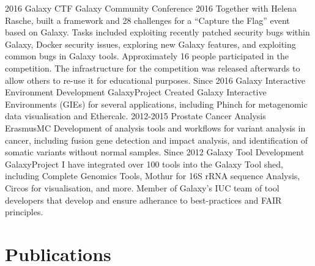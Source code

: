 \documentclass[]{shiltemann-cv}
\begin{document}
\begin{entrylist}
  \entry
    {2016}
    {Galaxy CTF}
    {Galaxy Community Conference 2016}
    {Together with Helena Rasche, built a framework and 28 challenges for a “Capture the Flag” event based on Galaxy. Tasks included exploiting recently patched security bugs within Galaxy, Docker security issues, exploring new Galaxy features, and exploiting common bugs in Galaxy tools. Approximately 16 people participated in the competition. The infrastructure for the competition was released afterwards to allow others to re-use it for educational purposes.}
   \entry
     {Since 2016}
     {Galaxy Interactive Environment Development}
     {GalaxyProject}
     {Created Galaxy Interactive Environments (GIEs) for several applications, including Phinch for metagenomic data visualisation and Ethercalc.}
   \entry
     {2012-2015}
     {Prostate Cancer Analysis}
     {ErasmusMC}
     {Development of analysis tools and workflows for variant analysis in cancer, including fusion gene detection and impact analysis, and identification of somatic variants without normal samples.}
   \entry
    {Since 2012}
    {Galaxy Tool Development}
    {GalaxyProject}
    {I have integrated over 100 tools into the Galaxy Tool shed, including Complete Genomics Tools, Mothur for 16S rRNA sequence Analysis, Circos for visualisation, and more. Member of Galaxy's IUC team of tool developers that develop and ensure adherance to best-practices and FAIR principles.}
\end{entrylist}
\newpage
\section{Publications}

\nocite{*} %
\printbibliography[title={~}]


%
\end{document}
